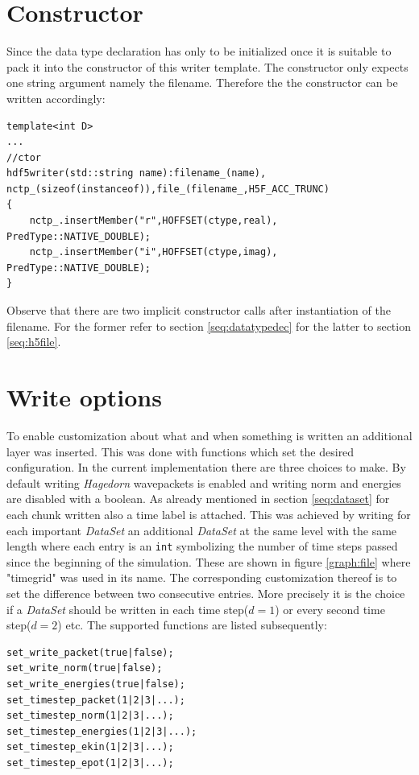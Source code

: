 \section{Constructor}
\label{seq:ctor}
Since the data type declaration has only to be initialized once it is suitable to pack it into the constructor of this writer template. The constructor only expects one string argument namely the filename. Therefore the the constructor can be written accordingly:
\begin{lstlisting}
template<int D>
...
//ctor
hdf5writer(std::string name):filename_(name), nctp_(sizeof(instanceof)),file_(filename_,H5F_ACC_TRUNC)
{
	nctp_.insertMember("r",HOFFSET(ctype,real), PredType::NATIVE_DOUBLE);
	nctp_.insertMember("i",HOFFSET(ctype,imag), PredType::NATIVE_DOUBLE);
}
\end{lstlisting}
Observe that there are two implicit constructor calls after instantiation of the filename. For the former refer to section \ref{seq:datatypedec} for the latter to section \ref{seq:h5file}.

\section{Write options}
To enable customization about what and when something is written an additional layer was inserted. This was done with functions which set the desired configuration. In the current implementation there are three choices to make. By default writing \textit{Hagedorn} wavepackets is enabled and writing norm and energies are disabled with a boolean. As already mentioned in section \ref{seq:dataset} for each chunk written also a time label is attached. This was achieved by writing for each important \textit{DataSet} an additional \textit{DataSet} at the same level with the same length where each entry is an \texttt{int} symbolizing the number of time steps passed since the beginning of the simulation. These are shown in figure \ref{graph:file} where "timegrid" was used in its name. The corresponding customization thereof is to set the difference between two consecutive entries. More precisely it is the choice if a \textit{DataSet} should be written in each time step($d=1$) or every second time step($d=2$) etc. The supported functions are listed subsequently:
\begin{lstlisting}
set_write_packet(true|false);
set_write_norm(true|false);
set_write_energies(true|false);
set_timestep_packet(1|2|3|...);
set_timestep_norm(1|2|3|...);
set_timestep_energies(1|2|3|...);
set_timestep_ekin(1|2|3|...);
set_timestep_epot(1|2|3|...);
\end{lstlisting}

